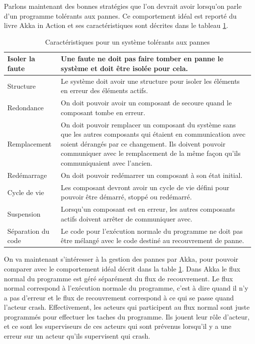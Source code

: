 \documentclass[12pt, a4paper]{article}
\begin{document}
\par Parlons maintenant des bonnes stratégies que l'on devrait avoir lorsqu'on parle d'un programme tolérants aux pannes. Ce comportement idéal est reporté du livre Akka in Action \cite{roestenburg2015akka} et ses caractéristiques sont décrites dans le tableau \ref{table1}.
\newline

\begin{table}[h]
\centering
\begin{tabular}{|l|p{}|}
\hline
Isoler la faute & Une faute ne doit pas faire tomber en panne le système et doit être isolée pour cela.\\ \hline
Structure & Le système doit avoir une structure pour isoler les éléments en erreur des éléments actifs. \\ \hline
Redondance & On doit pouvoir avoir un composant de secoure quand le composant tombe en erreur.\\ \hline
Remplacement & On doit pouvoir remplacer un composant du système sans que les autres composants qui étaient en communication avec soient dérangés par ce changement. Ils doivent pouvoir communiquer avec le remplacement de la même façon qu'ils communiquaient avec l'ancien. \\ \hline
Redémarrage & On doit pouvoir redémarrer un composant à son état initial. \\ \hline
Cycle de vie & Les composant devront avoir un cycle de vie défini pour pouvoir être démarré, stoppé ou redémarré. \\ \hline
Suspension & Lorsqu'un composant est en erreur, les autres composants actifs doivent arrêter de communiquer avec. \\ \hline
Séparation du code & Le code pour l’exécution normale du programme ne doit pas être mélangé avec le code destiné au recouvrement de panne. \\ \hline
\end{tabular}
\caption{Caractéristiques pour un système tolérants aux pannes}
\label{table1}
\end{table}
\par On va maintenant s'intéresser à la gestion des pannes par Akka, pour pouvoir comparer avec le comportement idéal décrit dans la table \ref{table1}. Dans Akka le flux normal du programme est géré séparément du flux de recouvrement. Le flux normal correspond à l’exécution normale du programme, c'est à dire quand il n'y a pas d'erreur et le flux de recouvrement correspond à ce qui se passe quand l'acteur crash. Effectivement, les acteurs qui participent au flux normal sont juste programmés pour effectuer les taches du programme. Ils jouent leur rôle d'acteur, et ce sont les superviseurs de ces acteurs qui sont prévenus lorsqu'il y a une erreur sur un acteur qu'ils supervisent qui crash. 
\end{document}
